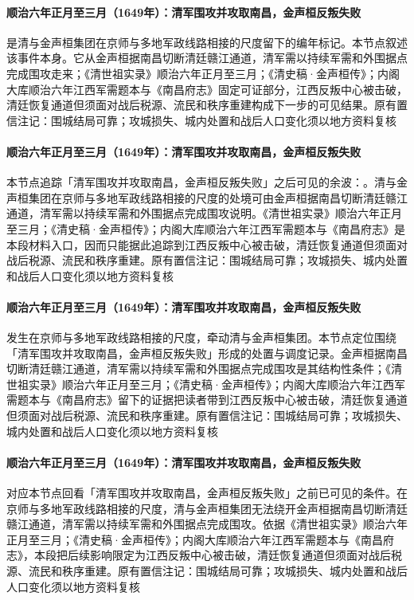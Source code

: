 \paragraph{顺治六年正月至三月（1649年）：清军围攻并攻取南昌，金声桓反叛失败}
 是清与金声桓集团在京师与多地军政线路相接的尺度留下的编年标记。本节点叙述该事件本身。它从金声桓据南昌切断清廷赣江通道，清军需以持续军需和外围据点完成围攻走来；《清世祖实录》顺治六年正月至三月；《清史稿·金声桓传》；内阁大库顺治六年江西军需题本与《南昌府志》固定可证部分，江西反叛中心被击破，清廷恢复通道但须面对战后税源、流民和秩序重建构成下一步的可见结果。原有置信注记：围城结局可靠；攻城损失、城内处置和战后人口变化须以地方资料复核

\paragraph{顺治六年正月至三月（1649年）：清军围攻并攻取南昌，金声桓反叛失败}
本节点追踪「清军围攻并攻取南昌，金声桓反叛失败」之后可见的余波：。清与金声桓集团在京师与多地军政线路相接的尺度的处境可由金声桓据南昌切断清廷赣江通道，清军需以持续军需和外围据点完成围攻说明。《清世祖实录》顺治六年正月至三月；《清史稿·金声桓传》；内阁大库顺治六年江西军需题本与《南昌府志》是本段材料入口，因而只能据此追踪到江西反叛中心被击破，清廷恢复通道但须面对战后税源、流民和秩序重建。原有置信注记：围城结局可靠；攻城损失、城内处置和战后人口变化须以地方资料复核

\paragraph{顺治六年正月至三月（1649年）：清军围攻并攻取南昌，金声桓反叛失败}
 发生在京师与多地军政线路相接的尺度，牵动清与金声桓集团。本节点定位围绕「清军围攻并攻取南昌，金声桓反叛失败」形成的处置与调度记录。金声桓据南昌切断清廷赣江通道，清军需以持续军需和外围据点完成围攻是其结构性条件；《清世祖实录》顺治六年正月至三月；《清史稿·金声桓传》；内阁大库顺治六年江西军需题本与《南昌府志》留下的证据把读者带到江西反叛中心被击破，清廷恢复通道但须面对战后税源、流民和秩序重建。原有置信注记：围城结局可靠；攻城损失、城内处置和战后人口变化须以地方资料复核

\paragraph{顺治六年正月至三月（1649年）：清军围攻并攻取南昌，金声桓反叛失败}
 对应本节点回看「清军围攻并攻取南昌，金声桓反叛失败」之前已可见的条件。在京师与多地军政线路相接的尺度，清与金声桓集团无法绕开金声桓据南昌切断清廷赣江通道，清军需以持续军需和外围据点完成围攻。依据《清世祖实录》顺治六年正月至三月；《清史稿·金声桓传》；内阁大库顺治六年江西军需题本与《南昌府志》，本段把后续影响限定为江西反叛中心被击破，清廷恢复通道但须面对战后税源、流民和秩序重建。原有置信注记：围城结局可靠；攻城损失、城内处置和战后人口变化须以地方资料复核


